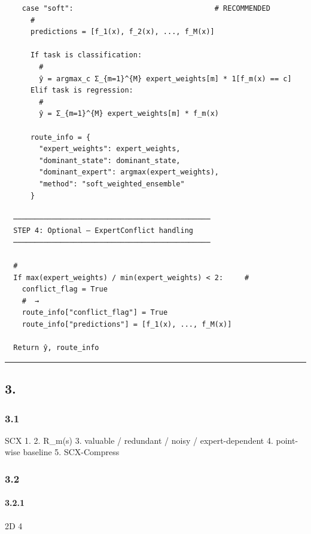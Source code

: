 \documentclass[
  12pt,
]{article}
\begin{document}
\begin{verbatim}
    case "soft":                                 # RECOMMENDED
      # 
      predictions = [f_1(x), f_2(x), ..., f_M(x)]

      If task is classification:
        # 
        ŷ = argmax_c Σ_{m=1}^{M} expert_weights[m] * 1[f_m(x) == c]
      Elif task is regression:
        # 
        ŷ = Σ_{m=1}^{M} expert_weights[m] * f_m(x)

      route_info = {
        "expert_weights": expert_weights,
        "dominant_state": dominant_state,
        "dominant_expert": argmax(expert_weights),
        "method": "soft_weighted_ensemble"
      }

  ──────────────────────────────────────────────
  STEP 4: Optional — ExpertConflict handling
  ──────────────────────────────────────────────

  # 
  If max(expert_weights) / min(expert_weights) < 2:     # 
    conflict_flag = True
    #  → 
    route_info["conflict_flag"] = True
    route_info["predictions"] = [f_1(x), ..., f_M(x)]

  Return ŷ, route_info
\end{verbatim}

\begin{center}\rule{0.5\linewidth}{0.5pt}\end{center}

\subsection{3.
}\label{ux5408ux6210ux5b9eux9a8cux8bbeux8ba1ux65b9ux6848}

\subsubsection{3.1 }\label{ux5b9eux9a8cux76eeux6807}

 SCX  1.
 2.  R\_m(s)
 3.  valuable /
redundant / noisy / expert-dependent 4. 
point-wise baseline 5. SCX-Compress 

\subsubsection{3.2
}\label{ux6570ux636eux751fux6210ux5668ux8bbeux8ba1}

\paragraph{3.2.1 }\label{ux72b6ux6001ux7ed3ux6784}

 2D  4 
\end{document}
